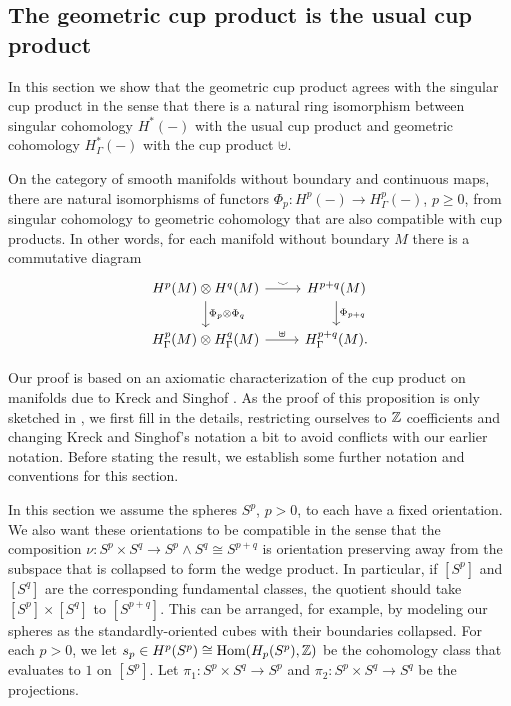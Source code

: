 \subsection{The geometric cup product is the usual cup product}\label{S: usual cup}

In this section we show that the geometric cup product agrees with the singular cup product in the sense that there is a natural ring isomorphism between singular cohomology $H^*(-)$ with the usual cup product and geometric cohomology $H^*_\Gamma(-)$ with the cup product $\uplus$.

\begin{theorem}\label{T: intersection is cup product}
	On the category of smooth manifolds without boundary and continuous maps, there are natural isomorphisms of functors $\Phi_p \colon H^p(-) \to H^p_\Gamma(-)$, $p \geq 0$, from singular cohomology to geometric cohomology that are also compatible with cup products.
	In other words, for each manifold without boundary $M$ there is a commutative diagram
	\[
	\begin{tikzcd}
		H^p(M) \otimes H^q(M) \arrow{r}{\smile} \arrow{d}{\Phi_p \otimes \Phi_q} &
		H^{p+q}(M) \arrow{d}{\Phi_{p+q}} \\
		H^p_\Gamma(M) \otimes H^q_\Gamma(M) \arrow{r}{\uplus} & H^{p+q}_\Gamma(M).
	\end{tikzcd}
	\]
\end{theorem}

Our proof is based on an axiomatic characterization of the cup product on manifolds due to Kreck and Singhof \cite[Proposition 12]{Krec10b}.
As the proof of this proposition is only sketched in \cite{Krec10b}, we first fill in the details, restricting ourselves to $\mathbb{Z}$ coefficients and changing Kreck and Singhof's notation a bit to avoid conflicts with our earlier notation.
Before stating the result, we establish some further notation and conventions for this section.

In this section we assume the spheres $S^p$, $p>0$, to each have a fixed orientation.
We also want these orientations to be compatible in the sense that the composition $\nu \colon S^p \times S^q \to S^p \wedge S^q \cong S^{p+q}$ is orientation preserving away from the subspace that is collapsed to form the wedge product.
In particular, if $[S^p]$ and $[S^q]$ are the corresponding fundamental classes, the quotient should take $[S^p] \times [S^q]$ to $[S^{p+q}]$.
This can be arranged, for example, by modeling our spheres as the standardly-oriented cubes with their boundaries collapsed.
For each $p>0$, we let $s_p \in H^p(S^p) \cong \textup{Hom}(H_p(S^p), \mathbb{Z})$ be the cohomology class that evaluates to $1$ on $[S^p]$.
Let $\pi_1 \colon S^p \times S^q \to S^p$ and $\pi_2 \colon S^p \times S^q \to S^q$ be the projections.

